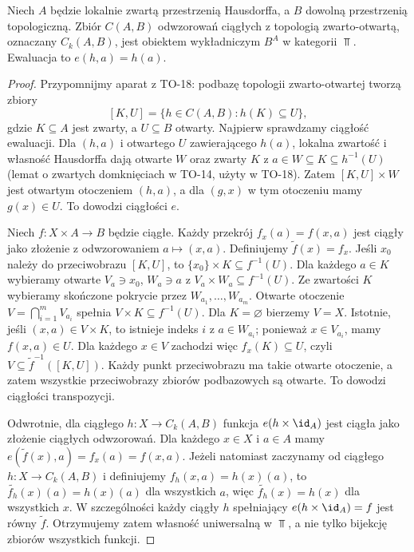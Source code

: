 \begin{twierdzenie}\label{cat:thm:exp-top}
Niech $A$ będzie lokalnie zwartą przestrzenią Hausdorffa, a $B$ dowolną przestrzenią topologiczną. Zbiór $C(A,B)$ odwzorowań ciągłych z topologią zwarto-otwartą, oznaczany $C_k(A,B)$, jest obiektem wykładniczym $B^A$ w kategorii $\Top$. Ewaluacja to $e(h,a)=h(a)$.
\end{twierdzenie}
\begin{proof}
Przypomnijmy aparat z TO-18: podbazę topologii zwarto-otwartej tworzą zbiory
\[
[K,U]=\{h\in C(A,B):h(K)\subseteq U\},
\]
gdzie $K\subseteq A$ jest zwarty, a $U\subseteq B$ otwarty. Najpierw sprawdzamy ciągłość ewaluacji. Dla $(h,a)$ i otwartego $U$ zawierającego $h(a)$, lokalna zwartość i własność Hausdorffa dają otwarte $W$ oraz zwarty $K$ z $a\in W\subseteq K\subseteq h^{-1}(U)$ (lemat o zwartych domknięciach w TO-14, użyty w TO-18). Zatem $[K,U]\times W$ jest otwartym otoczeniem $(h,a)$, a dla $(g,x)$ w tym otoczeniu mamy $g(x)\in U$. To dowodzi ciągłości $e$.

Niech $f:X\times A\to B$ będzie ciągłe. Każdy przekrój $f_x(a)=f(x,a)$ jest ciągły jako złożenie z odwzorowaniem $a\mapsto(x,a)$. Definiujemy $\widetilde f(x)=f_x$. Jeśli $x_0$ należy do przeciwobrazu $[K,U]$, to $\{x_0\}\times K\subseteq f^{-1}(U)$. Dla każdego $a\in K$ wybieramy otwarte $V_a\ni x_0$, $W_a\ni a$ z $V_a\times W_a\subseteq f^{-1}(U)$. Ze zwartości $K$ wybieramy skończone pokrycie przez $W_{a_1},\ldots,W_{a_m}$. Otwarte otoczenie $V=\bigcap_{i=1}^m V_{a_i}$ spełnia $V\times K\subseteq f^{-1}(U)$. Dla $K=\varnothing$ bierzemy $V=X$. Istotnie, jeśli $(x,a)\in V\times K$, to istnieje indeks $i$ z $a\in W_{a_i}$; ponieważ $x\in V_{a_i}$, mamy $f(x,a)\in U$. Dla każdego $x\in V$ zachodzi więc $f_x(K)\subseteq U$, czyli $V\subseteq\widetilde f^{-1}([K,U])$. Każdy punkt przeciwobrazu ma takie otwarte otoczenie, a zatem wszystkie przeciwobrazy zbiorów podbazowych są otwarte. To dowodzi ciągłości transpozycji.

Odwrotnie, dla ciągłego $h:X\to C_k(A,B)$ funkcja $e(h\times\id_A)$ jest ciągła jako złożenie ciągłych odwzorowań. Dla każdego $x\in X$ i $a\in A$ mamy $e(\widetilde f(x),a)=f_x(a)=f(x,a)$. Jeżeli natomiast zaczynamy od ciągłego $h:X\to C_k(A,B)$ i definiujemy $f_h(x,a)=h(x)(a)$, to $\widetilde{f_h}(x)(a)=h(x)(a)$ dla wszystkich $a$, więc $\widetilde{f_h}(x)=h(x)$ dla wszystkich $x$. W szczególności każdy ciągły $h$ spełniający $e(h\times\id_A)=f$ jest równy $\widetilde f$. Otrzymujemy zatem własność uniwersalną w $\Top$, a nie tylko bijekcję zbiorów wszystkich funkcji.
\end{proof}

